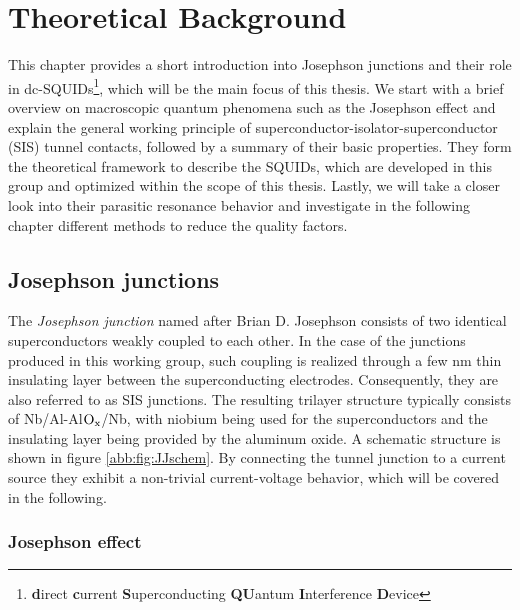 \chapter{Theoretical Background}

This chapter provides a short introduction into Josephson junctions and their role in dc-SQUIDs\footnote{\textbf{d}irect \textbf{c}urrent \textbf{S}uperconducting \textbf{QU}antum \textbf{I}nterference \textbf{D}evice}, which will be the main focus of this thesis. We start with a brief overview on macroscopic quantum phenomena such as the Josephson effect and explain the general working principle of superconductor-isolator-superconductor (SIS) tunnel contacts, followed by a summary of their basic properties. They form the theoretical framework to describe the SQUIDs, which are developed in this group and optimized within the scope of this thesis. Lastly, we will take a closer look into their parasitic resonance behavior and investigate in the following chapter different methods to reduce the quality factors.   

\section{Josephson junctions}


The \textit{Josephson junction} named after Brian D. Josephson consists of two identical superconductors weakly coupled to each other. In the case of the junctions produced in this working group, such coupling is realized through a few nm thin insulating layer between the superconducting electrodes. Consequently, they are also referred to as SIS junctions. The resulting trilayer structure typically consists of Nb/Al-Al$\rm O_x$/Nb, with niobium being used for the superconductors and the insulating layer being provided by the aluminum oxide. A schematic structure is shown in figure \ref{abb:fig:JJschem}. %
By connecting the tunnel junction to a current source they exhibit a non-trivial current-voltage behavior, which will be covered in the following. 

        
\subsection{Josephson effect}\label{subchap_Jeffect}

